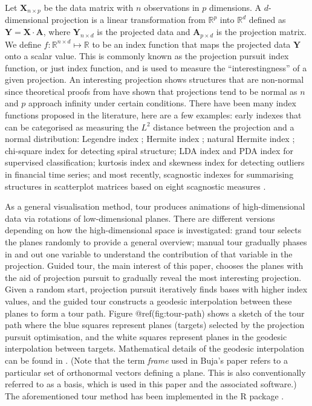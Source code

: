 Let \(\mathbf{X}_{n \times p}\) be the data matrix with \(n\)
observations in \(p\) dimensions. A \(d\)-dimensional projection is a
linear transformation from \(\mathbb{R}^p\) into \(\mathbb{R}^d\)
defined as \(\mathbf{Y} = \mathbf{X} \cdot \mathbf{A}\), where
\(\mathbf{Y}_{n \times d}\) is the projected data and
\(\mathbf{A}_{p\times d}\) is the projection matrix. We define
\(f: \mathbb{R}^{n \times d} \mapsto \mathbb{R}\) to be an index
function that maps the projected data \(\mathbf{Y}\) onto a scalar
value. This is commonly known as the projection pursuit index function,
or just index function, and is used to measure the ``interestingness''
of a given projection. An interesting projection shows structures that
are non-normal since theoretical proofs from
\citet{diaconis1984asymptotics} have shown that projections tend to be
normal as \(n\) and \(p\) approach infinity under certain conditions.
There have been many index functions proposed in the literature, here
are a few examples: early indexes that can be categorised as measuring
the \(L^2\) distance between the projection and a normal distribution:
Legendre index \citep{friedman1974projection}; Hermite index
\citep{hall1989polynomial}; natural Hermite index
\citep{cook1993projection}; chi-square index \citep{posse1995projection}
for detecting spiral structure; LDA index \citep{lee2005projection} and
PDA \citep{lee2010projection} index for supervised classification;
kurtosis index \citep{Loperfido2020} and skewness index
\citep{Loperfido2018} for detecting outliers in financial time series;
and most recently, scagnostic indexes \citep{laa2020using} for
summarising structures in scatterplot matrices based on eight scagnostic
measures \citep{scag, WW08}.

As a general visualisation method, tour produces animations of
high-dimensional data via rotations of low-dimensional planes. There are
different versions depending on how the high-dimensional space is
investigated: grand tour \citep{cook2008grand} selects the planes
randomly to provide a general overview; manual tour
\citep{cook1997manual} gradually phases in and out one variable to
understand the contribution of that variable in the projection. Guided
tour, the main interest of this paper, chooses the planes with the aid
of projection pursuit to gradually reveal the most interesting
projection. Given a random start, projection pursuit iteratively finds
bases with higher index values, and the guided tour constructs a
geodesic interpolation between these planes to form a tour path. Figure
@ref(fig:tour-path) shows a sketch of the tour path where the blue
squares represent planes (targets) selected by the projection pursuit
optimisation, and the white squares represent planes in the geodesic
interpolation between targets. Mathematical details of the geodesic
interpolation can be found in \citet{buja2005computational}. (Note that
the term \emph{frame} used in Buja's paper refers to a particular set of
orthonormal vectors defining a plane. This is also conventionally
referred to as a basis, which is used in this paper and the associated
software.) The aforementioned tour method has been implemented in the R
package  \citep{tourr}.

